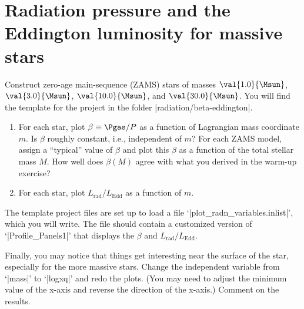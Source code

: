 
\DefineShortVerb{\|}

\section*{ Radiation pressure and the Eddington luminosity for massive stars}

Construct zero-age main-sequence (ZAMS) stars of masses $\val{1.0}{\Msun}$, $\val{3.0}{\Msun}$, $\val{10.0}{\Msun}$, and $\val{30.0}{\Msun}$. You will find the template for the project in  the folder |radiation/beta-eddington|. 

\begin{enumerate}
\item For each star, plot $\beta\equiv \Pgas/P$ as a function of Lagrangian mass coordinate $m$. Is $\beta$ roughly constant, i.e., independent of $m$? For each ZAMS model, assign a ``typical'' value of $\beta$ and plot this $\beta$ as a function of the total stellar mass $M$.  How well does $\beta(M)$ agree with what you derived in the warm-up exercise?

\item For each star, plot $L_{\mathrm{rad}}/L_{\mathrm{Edd}}$ as a function of $m$.
\end{enumerate}
The template project files are set up to load a file `|plot_radn_variables.inlist|', which you will write.  The file should contain a customized version of `|Profile_Panels1|' that displays the $\beta$ and $L_{\mathrm{rad}}/L_{\mathrm{Edd}}$.

Finally, you may notice that things get interesting near the surface of the star, especially for the more massive stars.  Change the independent variable from `|mass|' to `|logxq|' and redo the plots. (You may need to adjust the minimum value of the x-axis and reverse the direction of the x-axis.) Comment on the results.

\UndefineShortVerb{\|}
